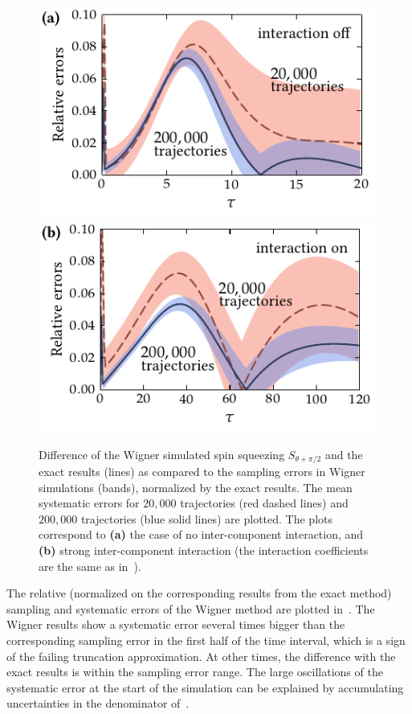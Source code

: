 \begin{figure}
    \centerline{%
    \includegraphics{figures_generated/exact/squeezing_nocc_err.pdf}%
    \includegraphics{figures_generated/exact/squeezing_cc_err.pdf}}

    \caption[Sampling and systematic errors in Wigner simulated spin squeezing]{
    Difference of the Wigner simulated spin squeezing $S_{\theta+\pi/2}$ and the exact results (lines) as compared to the sampling errors in Wigner simulations (bands), normalized by the exact results.
    The mean systematic errors for $20,000$ trajectories (red dashed lines) and $200,000$ trajectories (blue solid lines) are plotted.
    The plots correspond to \textbf{(a)} the case of no inter-component interaction, and \textbf{(b)} strong inter-component interaction (the interaction coefficients are the same as in~).}%

    \label{fig:exact:squeezing-error-comparison}
\end{figure}

The relative (normalized on the corresponding results from the exact method) sampling and systematic errors of the Wigner method are plotted in~.
The Wigner results show a systematic error several times bigger than the corresponding sampling error in the first half of the time interval, which is a sign of the failing truncation approximation.
At other times, the difference with the exact results is within the sampling error range.
The large oscillations of the systematic error at the start of the simulation can be explained by accumulating uncertainties in the denominator of~.

